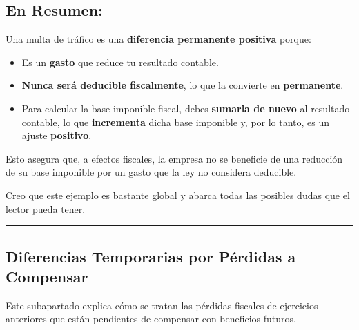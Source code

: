 \documentclass[
  paper=a4,
  ,captions=tableheading
]{scrbook}
\providecommand{\tightlist}{%
  \setlength{\itemsep}{0pt}\setlength{\parskip}{0pt}}
\begin{document}
\hypertarget{en-resumen}{%
\subsection{En Resumen:}\label{en-resumen}}

Una multa de tráfico es una \textbf{diferencia permanente positiva}
porque:

\begin{itemize}
\tightlist
\item
  Es un \textbf{gasto} que reduce tu resultado contable.
\item
  \textbf{Nunca será deducible fiscalmente}, lo que la convierte en
  \textbf{permanente}.
\item
  Para calcular la base imponible fiscal, debes \textbf{sumarla de
  nuevo} al resultado contable, lo que \textbf{incrementa} dicha base
  imponible y, por lo tanto, es un ajuste \textbf{positivo}.
\end{itemize}

Esto asegura que, a efectos fiscales, la empresa no se beneficie de una
reducción de su base imponible por un gasto que la ley no considera
deducible.

Creo que este ejemplo es bastante global y abarca todas las posibles
dudas que el lector pueda tener.

\begin{center}\rule{0.5\linewidth}{0.5pt}\end{center}

\hypertarget{diferencias-temporarias-por-puxe9rdidas-a-compensar}{%
\subsection{Diferencias Temporarias por Pérdidas a
Compensar}\label{diferencias-temporarias-por-puxe9rdidas-a-compensar}}

Este subapartado explica cómo se tratan las pérdidas fiscales de
ejercicios anteriores que están pendientes de compensar con beneficios
futuros.
\end{document}
